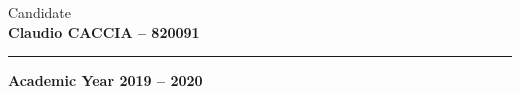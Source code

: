 \documentclass[a4paper,12pt,openright,notitlepage,twoside]{book}
\renewcommand{\chaptermark}[1]{\markboth{\chaptername\ \thechapter.\ #1}{}} %
\begin{document}
\begin{flushright}
\normalsize{Candidate} \\
\small{\textbf{Claudio CACCIA -- 820091}} \\
\end{flushright}
\vspace{15mm}

\begin{center}
\rule{\textwidth}{0.4pt}
\small{\textbf{Academic Year 2019 -- 2020}}
\end{center}


\fancyhead{} %
\fancyfoot{} %
\fancyhead[LE,RO]{\leftmark}
\fancyfoot[LE,RO]{\thepage}
\renewcommand{\headrulewidth}{0.4pt}
\renewcommand{\footrulewidth}{0pt}





% 
\cleardoublepage


\fancyhead[LE,RO]{\nouppercase{\leftmark}} %

\tableofcontents
{}
\cleardoublepage


\listoffigures
{}
\cleardoublepage


\listoftables
{}
\cleardoublepage


\fancyhead[LE]{\leftmark}
\fancyhead[RO]{\rightmark}
\fancyfoot[LE,RO]{\thepage}

\mainmatter %












\renewcommand{\chaptermark}[1]{\markboth{\appendixname\ \thechapter.\ #1}{}} %
\fancyhead[LE,RO]{\leftmark}

\appendix %



\cleardoublepage



\fancyhead[LE,RO]{\nouppercase{\leftmark}} %


\cleardoublepage


\end{document}
